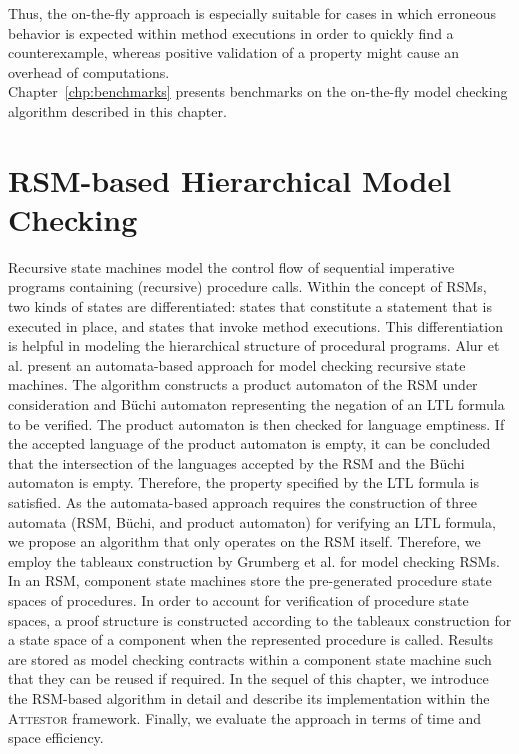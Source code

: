 \documentclass[a4paper, 12pt, twoside]{report}
\begin{document}
	Thus, the on-the-fly approach is especially suitable for cases in which erroneous behavior is expected within method executions in order to quickly find a counterexample, whereas positive validation of a property might cause an overhead of computations. \\
	
	Chapter~\ref{chp:benchmarks} presents benchmarks on the on-the-fly model checking algorithm described in this chapter.
	
	\chapter{RSM-based Hierarchical Model Checking}\label{chp:hmc}

	Recursive state machines model the control flow of sequential imperative programs containing (recursive) procedure calls. Within the concept of RSMs, two kinds of states are differentiated: states that constitute a statement that is executed in place, and states that invoke method executions. This differentiation is helpful in modeling the hierarchical structure of procedural programs. Alur et al. \cite{alur2001analysis} present an automata-based approach for model checking recursive state machines. The algorithm constructs a product automaton of the RSM under consideration and Büchi automaton representing the negation of an LTL formula to be verified. The product automaton is then checked for language emptiness. If the accepted language of the product automaton is empty, it can be concluded that the intersection of the languages accepted by the RSM and the Büchi automaton is empty. Therefore, the property specified by the LTL formula is satisfied. As the automata-based approach requires the construction of three automata (RSM, Büchi, and product automaton) for verifying an LTL formula, we propose an algorithm that only operates on the RSM itself. Therefore, we employ the tableaux construction by Grumberg et al.\cite{bhat1995efficient} for model checking RSMs. In an RSM, component state machines store the pre-generated procedure state spaces of procedures. In order to account for verification of procedure state spaces, a proof structure is constructed according to the tableaux construction for a state space of a component when the represented procedure is called. Results are stored as model checking contracts within a component state machine such that they can be reused if required. In the sequel of this chapter, we introduce the RSM-based algorithm in detail and describe its implementation within the \textsc{Attestor} framework. Finally, we evaluate the approach in terms of time and space efficiency.
\end{document}
